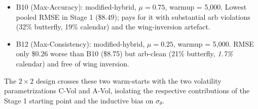 \documentclass[
  11pt,
]{article}
\providecommand{\tightlist}{%
  \setlength{\itemsep}{0pt}\setlength{\parskip}{0pt}}
\begin{document}
\begin{itemize}
\tightlist
\item
  B10 (Max-Accuracy): modified-hybrid, \(\mu = 0.75\), warmup = 5,000.
  Lowest pooled RMSE in Stage 1 (\$8.49); pays for it with substantial
  arb violations (32\% butterfly, 19\% calendar) and the wing-inversion
  artefact.
\item
  B12 (Max-Consistency): modified-hybrid, \(\mu = 0.25\), warmup =
  5,000. RMSE only \$0.26 worse than B10 (\$8.75) but arb-clean (21\%
  butterfly, \emph{1.7\%} calendar) and free of wing inversion.
\end{itemize}

The \(2 \times 2\) design crosses these two warm-starts with the two
volatility parametrizations C-Vol and A-Vol, isolating the respective
contributions of the Stage 1 starting point and the inductive bias on
\(\sigma_\theta\).

\pagebreak
\end{document}

